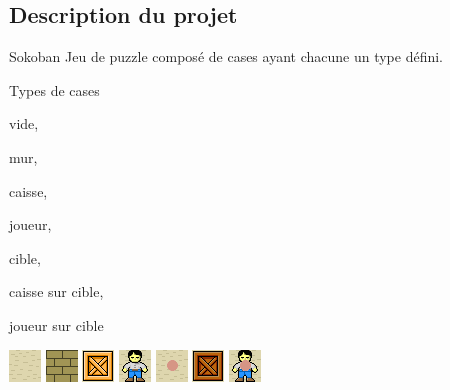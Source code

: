 \documentclass{beamer}
\begin{document}
\subsection{Description du projet}\label{project-desc}
\begin{frame}{}
  \begin{block}{Sokoban}
    Jeu de puzzle composé de cases ayant chacune un type défini.
  \end{block}
  
  \vspace{1em}
  
  \begin{block}{Types de cases}
    \begin{itemize*}[label=] %
      \item vide,
      \item mur,
      \item caisse,
      \item joueur,
      \item cible,
      \item caisse sur cible,
      \item joueur sur cible
    \end{itemize*}
  \end{block}
  
  \vspace{1em}
  
  \includegraphics{images/default/0.png}\hspace{1em}
  \includegraphics{images/default/1.png}\hspace{1em}
  \includegraphics{images/default/2.png}\hspace{1em}
  \includegraphics{images/default/3.png}\hspace{1em}
  \includegraphics{images/default/4.png}\hspace{1em}
  \includegraphics{images/default/5.png}\hspace{1em}
  \includegraphics{images/default/6.png}
\end{frame}
\end{document}
